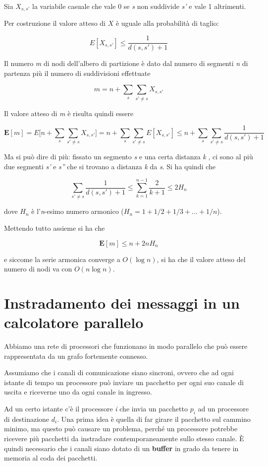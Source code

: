 Sia $X_{s,s'}$ la variabile casuale che vale 0 se \emph{s} non suddivide \emph{s'} e vale 1 altrimenti.

Per costruzione il valore atteso di $X$ è uguale alla probabilità di taglio:

$$
E[X_{s,s'}] \leq \frac{1}{d(s,s') +1}
$$

Il numero \emph{m} di nodi dell'albero di partizione è dato dal numero di segmenti \emph{n} di partenza più il numero di suddivisioni
effettuate

$$
m = n + \sum\limits_{s} \sum\limits_{s' \neq s}X_{s,s'}
$$

Il valore atteso di \emph{m} è risulta quindi essere

$$
\textbf{E}[m] = E\Bigg[n + \sum\limits_{s} \sum\limits_{s' \neq s}X_{s,s'} \Bigg] = n + \sum\limits_{s} \sum\limits_{s' \neq s} E[X_{s,s'}] \leq n + \sum\limits_{s} \sum\limits_{s' \neq s}  \frac{1}{d(s,s')+1}
$$

Ma si può dire di più: fissato un segmento \emph{s} e una certa distanza \emph{k} , ci sono al più due segmenti \emph{s'} e \emph{s''} che si
trovano a distanza \emph{k} da \emph{s}. 
Si ha quindi che

$$
\sum\limits_{s' \neq s} \frac{1}{d(s,s')+1} \leq \sum\limits_{k=1}^{n-1} \frac{2}{k+1} \leq 2H_n
$$

dove $H_n$ è l'\emph{n}-esimo numero armonico ($H_n = 1 + 1/2 + 1/3 + \ldots + 1/n$).

Mettendo tutto assieme si ha che

$$
\textbf{E}[m] \leq n + 2nH_n
$$

e siccome la serie armonica converge a $O(\log n)$, si ha che il valore atteso del numero di nodi va con $O(n \log n)$.

\section{Instradamento dei messaggi in un calcolatore parallelo}\label{instradamento-dei-messaggi-in-un-calcolatore-parallelo}

Abbiamo una rete di processori che funzionano in modo parallelo che può essere rappresentata da un grafo fortemente connesso.

Assumiamo che i canali di comunicazione siano sincroni, ovvero che ad ogni istante di tempo un processore può inviare un pacchetto per ogni suo canale di uscita e riceverne uno da ogni canale in ingresso.

Ad un certo istante c'è il processore \emph{i} che invia un pacchetto $p_i$ ad un processore di destinazione $d_i$. 
Una prima idea è quella di far girare il pacchetto sul cammino minimo, ma questo può causare un problema, perché un processore potrebbe ricevere più pacchetti da instradare contemporaneamente sullo stesso canale. 
\`{E} quindi necessario che i canali siano dotato di un \textbf{buffer} in grado da tenere in memoria al coda dei pacchetti.

